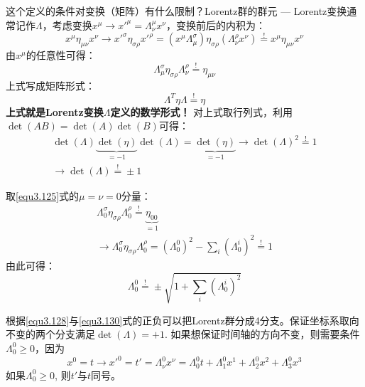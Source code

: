 这个定义的条件对变换（矩阵）有什么限制？Lorentz群的群元 --- Lorentz变换通常记作$\Lambda$，考虑变换$x^\mu \rightarrow x'^\mu = \Lambda^\mu_\nu x^\nu$，变换前后的内积为：
\begin{equation}
\label{equ3.124}
x^\mu \eta_{\mu \nu} x^\nu \rightarrow x'^\sigma \eta_{\sigma \rho} x'^\rho = (x^\mu \Lambda^\sigma_\mu) \eta_{\sigma \rho} (\Lambda^\rho_\nu x^\nu) \stackrel{!}{=} x^\mu \eta_{\mu \nu} x^\nu
\end{equation}
由$x^{\mu}$的任意性可得：
\begin{equation}
\label{equ3.125}
\Lambda^\sigma_\mu \eta_{\sigma \rho} \Lambda^\rho_\nu \stackrel{!}{=} \eta_{\mu \nu}
\end{equation}
上式写成矩阵形式：
\begin{equation}
\label{equ3.126}
\Lambda^T \eta \Lambda \stackrel{!}{=} \eta
\end{equation}
{\bf 上式就是Lorentz变换$\Lambda$定义的数学形式！} 对上式取行列式，利用$\det(AB) = \det(A) \det(B)$可得：
\begin{align}
\label{equ3.127}
\det(\Lambda) \underbrace{\det(\eta)}_{= -1} \det(\Lambda) = \underbrace{\det(\eta)}_{= -1} \rightarrow \det(\Lambda)^2 \stackrel{!}{=} 1 \\
\label{equ3.128}
\rightarrow \det(\Lambda) \stackrel{!}{=} \pm 1
\end{align}

取\ref{equ3.125}式的$\mu = \nu = 0$分量：
\begin{align}
	\Lambda_0^\sigma \eta_{\sigma \rho} \Lambda_0^\rho \stackrel{!}{=} \underbrace{\eta_{00}}_{=1} \nonumber \\
	\label{equ3.129}
	\rightarrow \Lambda_0^\sigma \eta_{\sigma \rho} \Lambda_0^\rho = (\Lambda_0^0)^2 - \sum_i (\Lambda_0^i)^2 \stackrel{!}{=} 1
\end{align}
由此可得：
\begin{equation}
	\label{equ3.130}
	\Lambda_0^0 \stackrel{!}{=} \pm \sqrt{1 + \sum_i (\Lambda_0^i)^2}
\end{equation}

根据\ref{equ3.128}与\ref{equ3.130}式的正负可以把Lorentz群分成4分支。保证坐标系取向不变的两个分支满足$\det (\Lambda) = +1$. 如果想保证时间轴的方向不变，则需要条件$\Lambda_0^0 \geq 0$，因为
\begin{equation}
	\label{equ3.131}
	x^0 = t \rightarrow x'^0 = t' = \Lambda_\nu^0 x^\nu = \Lambda_0^0 t + \Lambda_1^0 x^1 + \Lambda_2^0 x^2 + \Lambda_3^0 x^3
\end{equation}
如果$\Lambda_0^0 \geq 0$, 则$t'$与$t$同号。


